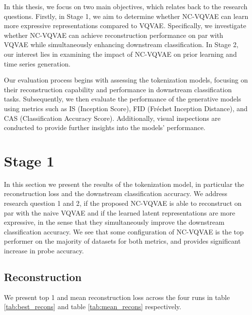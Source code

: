 \documentclass[../../thesis.tex]{subfiles}
\begin{document}
In this thesis, we focus on two main objectives, which relates back to the research questions. Firstly, in Stage 1, we aim to determine whether NC-VQVAE can learn more expressive representations compared to VQVAE. Specifically, we investigate whether NC-VQVAE can achieve reconstruction performance on par with VQVAE while simultaneously enhancing downstream classification. In Stage 2, our interest lies in examining the impact of NC-VQVAE on prior learning and time series generation.\newline

Our evaluation process begins with assessing the tokenization models, focusing on their reconstruction capability and performance in downstream classification tasks. Subsequently, we then evaluate the performance of the generative models using metrics such as IS (Inception Score), FID (Fréchet Inception Distance), and CAS (Classification Accuracy Score). Additionally, visual inspections are conducted to provide further insights into the models' performance.

\section{Stage 1}
In this section we present the results of the tokenization model, in particular the reconstruction loss and the downstream classification accuracy. We address research question 1 and 2, if the proposed NC-VQVAE is able to reconstruct on par with the naive VQVAE and if the learned latent representations are more expressive, in the sense that they simultaneously improve the downstream classification accuracy. We see that some configuration of NC-VQVAE is the top performer on the majority of datasets for both metrics, and provides significant increase in probe accuracy. 

\subsection{Reconstruction}

We present top 1 and mean reconstruction loss across the four runs in table \ref{tab:best_recons} and table \ref{tab:mean_recons} respectively.
\end{document}
